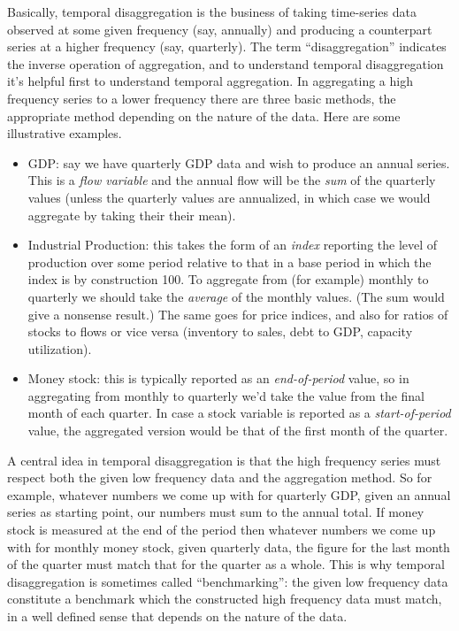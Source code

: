 Basically, temporal disaggregation is the business of taking
time-series data observed at some given frequency (say, annually) and
producing a counterpart series at a higher frequency (say,
quarterly). The term ``disaggregation'' indicates the inverse
operation of aggregation, and to understand temporal disaggregation
it's helpful first to understand temporal aggregation. In aggregating
a high frequency series to a lower frequency there are three basic
methods, the appropriate method depending on the nature of the data.
Here are some illustrative examples.
\begin{itemize}
\item GDP: say we have quarterly GDP data and wish to produce an
  annual series. This is a \textit{flow variable} and the annual flow
  will be the \textit{sum} of the quarterly values (unless the
  quarterly values are annualized, in which case we would aggregate by
  taking their their mean).
\item Industrial Production: this takes the form of an \textit{index}
  reporting the level of production over some period relative to that
  in a base period in which the index is by construction 100. To
  aggregate from (for example) monthly to quarterly we should take the
  \textit{average} of the monthly values. (The sum would give a
  nonsense result.) The same goes for price indices, and also for
  ratios of stocks to flows or vice versa (inventory to sales, debt to
  GDP, capacity utilization).
\item Money stock: this is typically reported as an
  \textit{end-of-period} value, so in aggregating from monthly to
  quarterly we'd take the value from the final month of each
  quarter. In case a stock variable is reported as a
  \textit{start-of-period} value, the aggregated version would be that
  of the first month of the quarter.
\end{itemize}

A central idea in temporal disaggregation is that the high frequency
series must respect both the given low frequency data and the
aggregation method. So for example, whatever numbers we come up with
for quarterly GDP, given an annual series as starting point, our
numbers must sum to the annual total. If money stock is measured at
the end of the period then whatever numbers we come up with for
monthly money stock, given quarterly data, the figure for the last
month of the quarter must match that for the quarter as a whole.  This
is why temporal disaggregation is sometimes called ``benchmarking'':
the given low frequency data constitute a benchmark which the
constructed high frequency data must match, in a well defined sense
that depends on the nature of the data.

